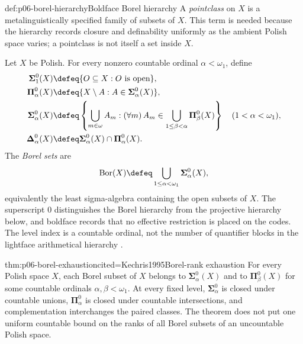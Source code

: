 \begin{hbdefinition}{def:p06-borel-hierarchy}{Boldface Borel hierarchy}
A \emph{pointclass} on \(X\) is a metalinguistically specified family of
subsets of \(X\).  This term is needed because the hierarchy records closure
and definability uniformly as the ambient Polish space varies; a pointclass is
not itself a set inside \(X\).

Let \(X\) be Polish.  For every nonzero countable ordinal
\(\alpha<\omega_1\), define
\[
\begin{aligned}
  \boldsymbol{\Sigma}^{0}_{1}(X)
    &\defeq \{O\subseteq X:O\text{ is open}\},\\
  \boldsymbol{\Pi}^{0}_{\alpha}(X)
    &\defeq \{X\setminus A:A\in
       \boldsymbol{\Sigma}^{0}_{\alpha}(X)\},\\
  \boldsymbol{\Sigma}^{0}_{\alpha}(X)
    &\defeq
      \left\{\bigcup_{m\in\omega}A_m:
      (\forall m)\,
      A_m\in
      \bigcup_{1\leq\beta<\alpha}
      \boldsymbol{\Pi}^{0}_{\beta}(X)\right\}
      \quad(1<\alpha<\omega_1),\\
  \boldsymbol{\Delta}^{0}_{\alpha}(X)
    &\defeq
      \boldsymbol{\Sigma}^{0}_{\alpha}(X)
      \cap\boldsymbol{\Pi}^{0}_{\alpha}(X).
\end{aligned}
\]
The \emph{Borel sets} are
\[
  \operatorname{Bor}(X)
  \defeq \bigcup_{1\leq\alpha<\omega_1}
  \boldsymbol{\Sigma}^{0}_{\alpha}(X),
\]
equivalently the least sigma-algebra containing the open subsets of \(X\).
The superscript \(0\) distinguishes the Borel hierarchy from the projective
hierarchy below, and boldface records that no effective restriction is placed
on the codes.  The level index is a countable ordinal, not the number of
quantifier blocks in the lightface arithmetical hierarchy
\cite[Sections~11--13]{Kechris1995}.
\end{hbdefinition}

\begin{hbtheorem}{thm:p06-borel-exhaustion}{cited=Kechris1995}{Borel-rank exhaustion}
For every Polish space \(X\), each Borel subset of \(X\) belongs to
\(\boldsymbol{\Sigma}^{0}_{\alpha}(X)\) and to
\(\boldsymbol{\Pi}^{0}_{\beta}(X)\) for some countable ordinals
\(\alpha,\beta<\omega_1\).  At every fixed level,
\(\boldsymbol{\Sigma}^{0}_{\alpha}\) is closed under countable unions,
\(\boldsymbol{\Pi}^{0}_{\alpha}\) is closed under countable intersections,
and complementation interchanges the paired classes.  The theorem does not
put one uniform countable bound on the ranks of all Borel subsets of an
uncountable Polish space.
\end{hbtheorem}

